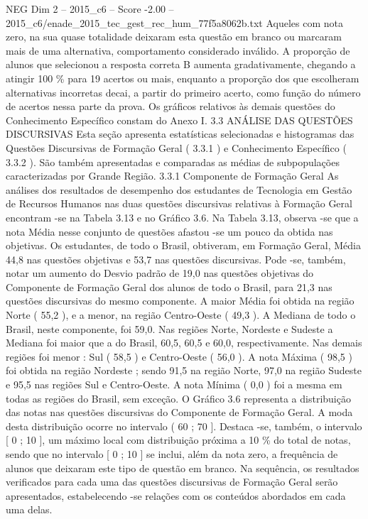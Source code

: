 \begin{textsample}{NEG Dim 2 – 2015\_c6 – Score -2.00 – 2015\_c6/enade\_2015\_tec\_gest\_rec\_hum\_77f5a8062b.txt}
Aqueles com nota zero, na sua quase totalidade deixaram esta questão em branco ou marcaram mais de uma alternativa, comportamento considerado inválido.
A proporção de alunos que selecionou a resposta correta B aumenta gradativamente, chegando a atingir 100 \% para 19 acertos ou mais, enquanto a proporção dos que escolheram alternativas incorretas decai, a partir do primeiro acerto, como função do número de acertos nessa parte da prova.
Os gráficos relativos às demais questões do Conhecimento Específico constam do Anexo I. 3.3 ANÁLISE DAS QUESTÕES DISCURSIVAS Esta seção apresenta estatísticas selecionadas e histogramas das Questões Discursivas de Formação Geral ( 3.3.1 ) e Conhecimento Específico ( 3.3.2 ).
São também apresentadas e comparadas as médias de subpopulações caracterizadas por Grande Região. 3.3.1 Componente de Formação Geral As análises dos resultados de desempenho dos estudantes de Tecnologia em Gestão de Recursos Humanos nas duas questões discursivas relativas à Formação Geral encontram -se na Tabela 3.13 e no Gráfico 3.6.
Na Tabela 3.13, observa -se que a nota Média nesse conjunto de questões afastou -se um pouco da obtida nas objetivas.
Os estudantes, de todo o Brasil, obtiveram, em Formação Geral, Média 44,8 nas questões objetivas e 53,7 nas questões discursivas.
Pode -se, também, notar um aumento do Desvio padrão de 19,0 nas questões objetivas do Componente de Formação Geral dos alunos de todo o Brasil, para 21,3 nas questões discursivas do mesmo componente.
A maior Média foi obtida na região Norte ( 55,2 ), e a menor, na região Centro-Oeste ( 49,3 ).
A Mediana de todo o Brasil, neste componente, foi 59,0.
Nas regiões Norte, Nordeste e Sudeste a Mediana foi maior que a do Brasil, 60,5, 60,5 e 60,0, respectivamente.
Nas demais regiões foi menor : Sul ( 58,5 ) e Centro-Oeste ( 56,0 ).
A nota Máxima ( 98,5 ) foi obtida na região Nordeste ; sendo 91,5 na região Norte, 97,0 na região Sudeste e 95,5 nas regiões Sul e Centro-Oeste.
A nota Mínima ( 0,0 ) foi a mesma em todas as regiões do Brasil, sem exceção.
O Gráfico 3.6 representa a distribuição das notas nas questões discursivas do Componente de Formação Geral.
A moda desta distribuição ocorre no intervalo ( 60 ; 70 ].
Destaca -se, também, o intervalo [ 0 ; 10 ], um máximo local com distribuição próxima a 10 \% do total de notas, sendo que no intervalo [ 0 ; 10 ] se inclui, além da nota zero, a frequência de alunos que deixaram este tipo de questão em branco.
Na sequência, os resultados verificados para cada uma das questões discursivas de Formação Geral serão apresentados, estabelecendo -se relações com os conteúdos abordados em cada uma delas.

\end{textsample}
